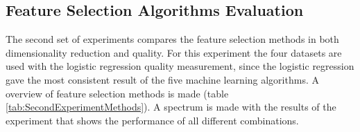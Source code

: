 \documentclass[10pt,a4paper]{article}
\begin{document}
	\subsection{Feature Selection Algorithms Evaluation}
	\label{subsec:FeatureSelectionAlgorithmsEvaluation}

	The second set of experiments compares the feature selection methods in both dimensionality reduction and quality. For this experiment the four datasets are used with the logistic regression quality measurement, since the logistic regression gave the most consistent result of the five machine learning algorithms. A overview of feature selection methods is made (table \ref{tab:SecondExperimentMethods}). A spectrum is made with the results of the experiment that shows the performance of all different combinations.
\end{document}
